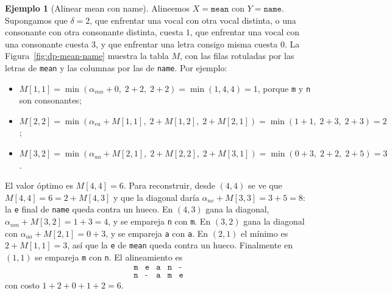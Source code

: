 \documentclass[12pt, spanish, oneside, openany]{book}
\theoremstyle{uprightplain}
\theoremstyle{definition}
\newtheorem{ejemplo}[teorema]{Ejemplo}
\theoremstyle{remark}
\theoremstyle{definition}
\begin{document}
\begin{ejemplo}[Alinear mean con name]
\label{ej:dp-mean-name}
Alineemos $X=\texttt{mean}$ con $Y=\texttt{name}$. Supongamos que $\delta=2$, que enfrentar una vocal con otra vocal distinta, o una consonante con otra consonante distinta, cuesta $1$, que enfrentar una vocal con una consonante cuesta $3$, y que enfrentar una letra consigo misma cuesta $0$. La Figura~\ref{fig:dp-mean-name} muestra la tabla $M$, con las filas rotuladas por las letras de \texttt{mean} y las columnas por las de \texttt{name}. Por ejemplo:
\begin{itemize}
    \item $M[1,1]=\min(\alpha_{mn}+0,\;2+2,\;2+2)=\min(1,4,4)=1$, porque \texttt{m} y \texttt{n} son consonantes;
    \item $M[2,2]=\min(\alpha_{ea}+M[1,1],\;2+M[1,2],\;2+M[2,1])=\min(1+1,\;2+3,\;2+3)=2$;
    \item $M[3,2]=\min(\alpha_{aa}+M[2,1],\;2+M[2,2],\;2+M[3,1])=\min(0+3,\;2+2,\;2+5)=3$.
\end{itemize}
El valor óptimo es $M[4,4]=6$. Para reconstruir, desde $(4,4)$ se ve que $M[4,4]=6=2+M[4,3]$ y que la diagonal daría $\alpha_{ne}+M[3,3]=3+5=8$: la \texttt{e} final de \texttt{name} queda contra un hueco. En $(4,3)$ gana la diagonal, $\alpha_{nm}+M[3,2]=1+3=4$, y se empareja \texttt{n} con \texttt{m}. En $(3,2)$ gana la diagonal con $\alpha_{aa}+M[2,1]=0+3$, y se empareja \texttt{a} con \texttt{a}. En $(2,1)$ el mínimo es $2+M[1,1]=3$, así que la \texttt{e} de \texttt{mean} queda contra un hueco. Finalmente en $(1,1)$ se empareja \texttt{m} con \texttt{n}. El alineamiento es
\[
\begin{array}{ccccc}
\texttt{m} & \texttt{e} & \texttt{a} & \texttt{n} & \texttt{-}\\
\texttt{n} & \texttt{-} & \texttt{a} & \texttt{m} & \texttt{e}
\end{array}
\]
con costo $1+2+0+1+2=6$.
\end{ejemplo}
\end{document}

